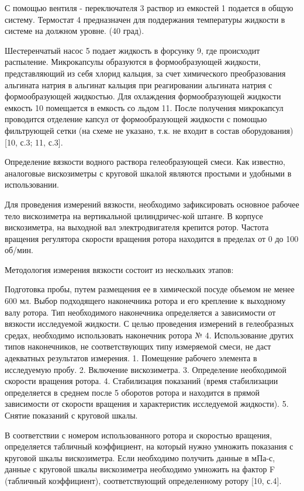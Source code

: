 \begin{multicols}{2}

С помощью вентиля - переключателя 3 раствор из емкостей 1 подается в
общую систему. Термостат 4 предназначен для поддержания температуры
жидкости в системе на должном уровне. (40 град).

Шестеренчатый насос 5 подает жидкость в форсунку 9, где происходит
распыление. Микрокапсулы образуются в формообразующей жидкости,
представляющий из себя хлорид кальция, за счет химического
преобразования альгината натрия в альгинат кальция при реагировании
альгината натрия с формообразующей жидкостью. Для охлаждения
формообразующей жидкости емкость 10 помещается в емкость со льдом 11.
После получения микрокапсул проводится отделение капсул от
формообразующей жидкости с помощью фильтрующей сетки (на схеме не
указано, т.к. не входит в состав оборудования) {[}10, с.3; 11, с.3{]}.

Определение вязкости водного раствора гелеобразующей смеси. Как
известно, аналоговые вискозиметры с круговой шкалой являются простыми и
удобными в использовании.

Для проведения измерений вязкости, необходимо зафиксировать основное
рабочее тело вискозиметра на вертикальной цилиндричес-кой штанге. В
корпусе вискозиметра, на выходной вал электродвигателя крепится ротор.
Частота вращения регулятора скорости вращения ротора находится в
пределах от 0 до 100 об/мин.

Методология измерения вязкости состоит из нескольких этапов:

Подготовка пробы, путем размещения ее в химической посуде объемом не
менее 600 мл. Выбор подходящего наконечника ротора и его крепление к
выходному валу ротора. Тип необходимого наконечника определяется а
зависимости от вязкости исследуемой жидкости. С целью проведения
измерений в гелеобразных средах, необходимо использовать наконечник
ротора № 4. Использование других типов наконечников, не соответствующих
типу измеряемой смеси, не даст адекватных результатов измерения. 1.
Помещение рабочего элемента в исследуемую пробу. 2. Включение
вискозиметра. 3. Определение необходимой скорости вращения ротора. 4.
Стабилизация показаний (время стабилизации определяется в среднем после
5 оборотов ротора и находится в прямой зависимости от скорости вращения
и характеристик исследуемой жидкости). 5. Снятие показаний с круговой
шкалы.

В соответствии с номером использованного ротора и скоростью вращения,
определяется табличный коэффициент, на который нужно умножить показания
с круговой шкалы вискозиметра. Если необходимо получить данные в мПа-с,
данные с круговой шкалы вискозиметра необходимо умножить на фактор F
(табличный коэффициент), соответствующий определенному ротору {[}10,
с.4{]}.


\end{multicols}
